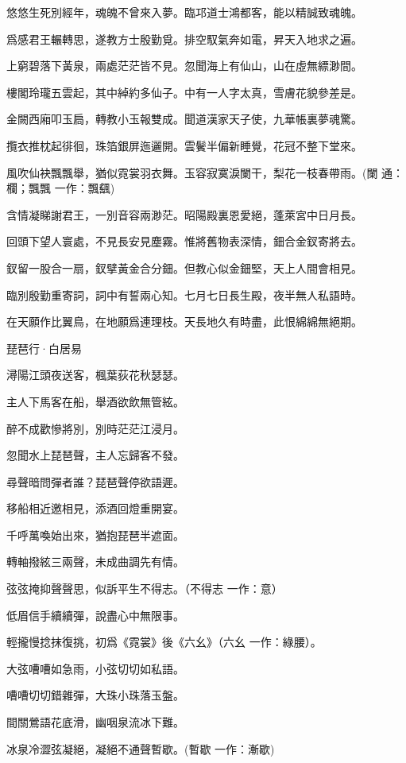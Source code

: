 \documentclass[12pt,a4paper]{ctexbook}
\begin{document}
悠悠生死別經年，魂魄不曾來入夢。臨邛道士鴻都客，能以精誠致魂魄。\par
爲感君王輾轉思，遂教方士殷勤覓。排空馭氣奔如電，昇天入地求之遍。\par
上窮碧落下黃泉，兩處茫茫皆不見。忽聞海上有仙山，山在虛無縹渺間。\par
樓閣玲瓏五雲起，其中綽約多仙子。中有一人字太真，雪膚花貌參差是。\par
金闕西廂叩玉扃，轉教小玉報雙成。聞道漢家天子使，九華帳裏夢魂驚。\par
攬衣推枕起徘徊，珠箔銀屏迤邐開。雲鬢半偏新睡覺，花冠不整下堂來。\par
風吹仙袂飄飄舉，猶似霓裳羽衣舞。玉容寂寞淚闌干，梨花一枝春帶雨。(闌 通：欄；飄飄 一作：飄颻)\par
含情凝睇謝君王，一別音容兩渺茫。昭陽殿裏恩愛絕，蓬萊宮中日月長。\par
回頭下望人寰處，不見長安見塵霧。惟將舊物表深情，鈿合金釵寄將去。\par
釵留一股合一扇，釵擘黃金合分鈿。但教心似金鈿堅，天上人間會相見。\par
臨別殷勤重寄詞，詞中有誓兩心知。七月七日長生殿，夜半無人私語時。\par
在天願作比翼鳥，在地願爲連理枝。天長地久有時盡，此恨綿綿無絕期。\par
琵琶行·白居易\par
潯陽江頭夜送客，楓葉荻花秋瑟瑟。\par
主人下馬客在船，舉酒欲飲無管絃。\par
醉不成歡慘將別，別時茫茫江浸月。\par
忽聞水上琵琶聲，主人忘歸客不發。\par
尋聲暗問彈者誰？琵琶聲停欲語遲。\par
移船相近邀相見，添酒回燈重開宴。\par
千呼萬喚始出來，猶抱琵琶半遮面。\par
轉軸撥絃三兩聲，未成曲調先有情。\par
弦弦掩抑聲聲思，似訴平生不得志。（不得志 一作：意）\par
低眉信手續續彈，說盡心中無限事。\par
輕攏慢捻抹復挑，初爲《霓裳》後《六幺》（六幺 一作：綠腰）。\par
大弦嘈嘈如急雨，小弦切切如私語。\par
嘈嘈切切錯雜彈，大珠小珠落玉盤。\par
間關鶯語花底滑，幽咽泉流冰下難。\par
冰泉冷澀弦凝絕，凝絕不通聲暫歇。(暫歇 一作：漸歇)\par
\end{document}
